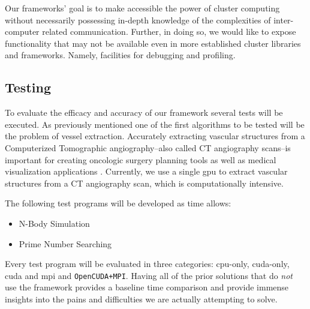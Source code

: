 Our frameworks' goal is to make accessible the power of \gls{cluster} computing
without necessarily possessing in-depth knowledge of the complexities of
inter-computer related communication. Further, in doing so, we would like to
expose functionality that may not be available even in more established
\gls{cluster} libraries and frameworks. Namely, facilities for debugging and
profiling.

\subsection{Testing}

To evaluate the efficacy and accuracy of our framework several tests will be
executed. As previously mentioned one of the first algorithms to be tested will
be the problem of vessel extraction. Accurately extracting vascular structures
from a Computerized Tomographic angiography--also called CT angiography
scans--is important for creating oncologic surgery planning tools as well as
medical visualization applications \cite{erdt2008automatic}.  Currently, we use
a single \gls{gpu} to extract vascular structures from a CT angiography scan,
which is computationally intensive.

The following test programs will be developed as time allows:

\begin{itemize}
    \item N-Body Simulation
    \item Prime Number Searching
\end{itemize}

Every test program will be evaluated in three categories: \gls{cpu}-only,
\gls{cuda}-only, \gls{cuda} and \gls{mpi} and \texttt{OpenCUDA+MPI}. Having all
of the prior solutions that do \emph{not} use the framework provides a baseline
time comparison and provide immense insights into the pains and difficulties we
are actually attempting to solve.
